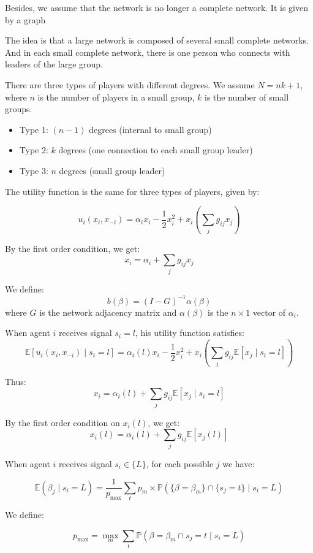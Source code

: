 \documentclass[12pt]{article}
\begin{document}
Besides, we assume that the network is no longer a complete network.  
It is given by a graph


The idea is that a large network is composed of several small complete networks.  
And in each small complete network, there is one person who connects with leaders of the large group.

There are three types of players with different degrees.  
We assume $N = nk + 1$, where $n$ is the number of players in a small group, $k$ is the number of small groups.

\begin{itemize}
    \item Type 1: $(n-1)$ degrees (internal to small group)
    \item Type 2: $k$ degrees (one connection to each small group leader)
    \item Type 3: $n$ degrees (small group leader)
\end{itemize}

The utility function is the same for three types of players, given by:

\[
u_i(x_i, x_{-i}) = \alpha_i x_i - \frac{1}{2}x_i^2 + x_i\left( \sum_j g_{ij} x_j \right)
\]

By the first order condition, we get:
\[
x_i = \alpha_i + \sum_j g_{ij} x_j
\]

We define:
\[
b(\beta) = (I - G)^{-1} \alpha(\beta)
\]
where $G$ is the network adjacency matrix and $\alpha(\beta)$ is the $n \times 1$ vector of $\alpha_i$.

When agent $i$ receives signal $s_i = l$, his utility function satisfies:
\[
\mathbb{E}[u_i(x_i, x_{-i}) \mid s_i = l] = \alpha_i(l) x_i - \frac{1}{2}x_i^2 + x_i \left( \sum_j g_{ij} \mathbb{E}[x_j \mid s_i = l] \right)
\]

Thus:
\[
x_i = \alpha_i(l) + \sum_j g_{ij} \mathbb{E}[x_j \mid s_i = l]
\]

By the first order condition on $x_i(l)$, we get:
\[
x_i(l) = \alpha_i(l) + \sum_j g_{ij} \mathbb{E}[x_j(l)]
\]

When agent $i$ receives signal $s_i \in \{L\}$, for each possible $j$ we have:

\[
\mathbb{E}(\beta_j \mid s_i = L) = \frac{1}{p_{\max}} \sum_{t} p_{m} \times \mathbb{P}(\{\beta = \beta_m\} \cap \{s_j = t\} \mid s_i = L)
\]

We define:

\[
p_{\max} = \max_{m} \sum_{t} \mathbb{P}(\beta = \beta_m \cap s_j = t \mid s_i = L)
\]
\end{document}
